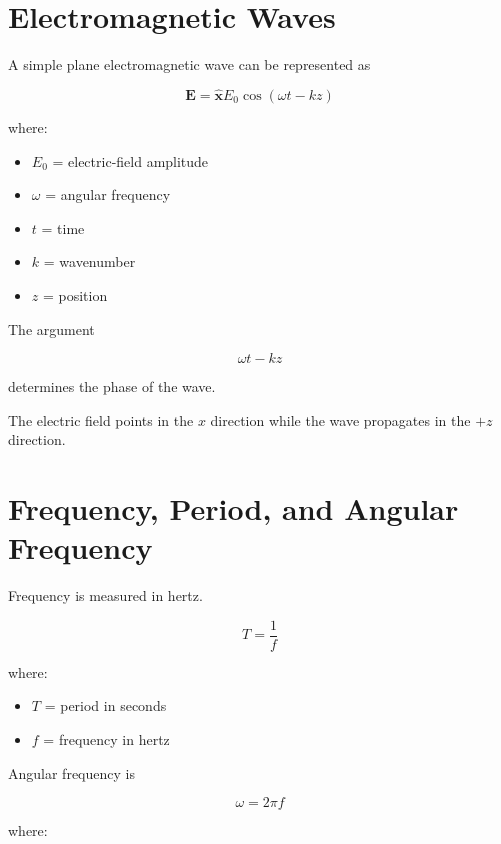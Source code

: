 \documentclass[11pt]{article}
\newcommand{\vect}[1]{\mathbf{#1}}
\newcommand{\uvect}[1]{\hat{\mathbf{#1}}}
\begin{document}

\section{Electromagnetic Waves}

A simple plane electromagnetic wave can be represented as

\[
\boxed{
\vect{E}
=
\uvect{x}
E_0
\cos(\omega t-kz)
}
\]

where:

\begin{itemize}
    \item $E_0$ = electric-field amplitude
    \item $\omega$ = angular frequency
    \item $t$ = time
    \item $k$ = wavenumber
    \item $z$ = position
\end{itemize}

The argument

\[
\omega t-kz
\]

determines the phase of the wave.

The electric field points in the $x$ direction while the wave propagates in the $+z$ direction.



\section{Frequency, Period, and Angular Frequency}

Frequency is measured in hertz.

\[
\boxed{
T=\frac{1}{f}
}
\]

where:

\begin{itemize}
    \item $T$ = period in seconds
    \item $f$ = frequency in hertz
\end{itemize}

Angular frequency is

\[
\boxed{
\omega=2\pi f
}
\]

where:
\end{document}
